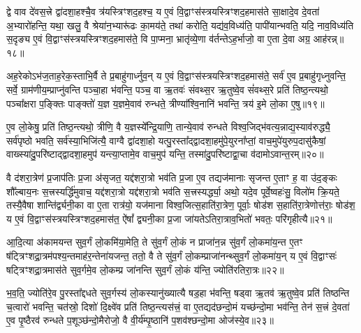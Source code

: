द्वे वाव दे॑वस॒त्त्रे द्वा॑दशा॒हश्चै॒व त्र॑यस्त्रिꣳशद॒हश्च॒ य ए॒वं वि॒द्वाꣳस॑स्त्रयस्त्रिꣳशद॒हमास॑ते सा॒क्षादे॒व दे॒वता॑ अ॒भ्यारो॑हन्ति॒ यथा॒ खलु॒ वै श्रेया॑न॒भ्यारू॑ढः का॒मय॑ते॒ तथा॑ करोति॒ यद्य॑व॒विध्य॑ति॒ पापी॑यान्भवति॒ यदि॒ नाव॒विध्य॑ति स॒दृङ्य ए॒वं वि॒द्वाꣳस॑स्त्रयस्त्रिꣳशद॒हमास॑ते॒ वि पा॒प्मना॒ भ्रातृ॑व्ये॒णा व॑र्तन्ते\-ऽह॒र्भाजो॒ वा ए॒ता दे॒वा अग्र॒ आह॑रन्न्॥१८॥

अह॒रेको\-ऽभ॑ज॒ताह॒रेक॒स्ताभि॒र्वै ते प्र॒बाहु॑गार्ध्नुव॒न् य ए॒वं वि॒द्वाꣳस॑स्त्रयस्त्रिꣳशद॒हमास॑ते॒ सर्व॑ ए॒व प्र॒बाहु॑गृध्नुवन्ति॒ सर्वे॒ ग्राम॑णीय॒म्प्राप्नु॑वन्ति पञ्चा॒हा भ॑वन्ति॒ पञ्च॒ वा ऋ॒तवः॑ संवथ्स॒र ऋ॒तुष्वे॒व सं॑वथ्स॒रे प्रति॑ तिष्ठ॒न्त्यथो॒ पञ्चा᳚क्षरा प॒ङ्क्तिः पाङ्क्तो॑ य॒ज्ञ य॒ज्ञमे॒वाव॑ रुन्धते॒ त्रीण्या᳚श्वि॒नानि॑ भवन्ति॒ त्रय॑ इ॒मे लो॒का ए॒षु॥१९॥

ए॒व लो॒केषु॒ प्रति॑ तिष्ठ॒न्त्यथो॒ त्रीणि॒ वै य॒ज्ञस्ये᳚न्द्रि॒याणि॒ तान्ये॒वाव॑ रुन्धते विश्व॒जिद्भ॑वत्य॒न्नाद्य॒स्याव॑रुद्ध्यै॒ सर्व॑पृष्ठो भवति॒ सर्व॑स्या॒भिजि॑त्यै॒ वाग्वै द्वा॑दशा॒हो यत्पु॒रस्ता᳚द्द्वादशा॒हमु॑पे॒युरना᳚प्तां॒ वाच॒मुपे॑युरुप॒दासु॑कैषां॒ वाख्स्या॑दु॒परि॑ष्टाद्द्वादशा॒हमुप॑ यन्त्या॒प्तामे॒व वाच॒मुप॑ यन्ति॒ तस्मा॑दु॒परि॑ष्टाद्वा॒चा व॑दामो\-ऽवान्त॒रम्॥२०॥

वै द॑शरा॒त्रेण॑ प्र॒जाप॑तिः प्र॒जा अ॑सृजत॒ यद्द॑शरा॒त्रो भव॑ति प्र॒जा ए॒व तद्यज॑मानाः सृजन्त ए॒ताꣳ ह॒ वा उ॑द॒ङ्कः शौ᳚ल्बाय॒नः स॒त्त्रस्यर्द्धि॑मुवाच॒ यद्द॑शरा॒त्रो यद्द॑शरा॒त्रो भव॑ति स॒त्त्रस्यर्द्ध्या॒ अथो॒ यदे॒व पूर्वे॒ष्वहः॑सु॒ विलो॑म क्रि॒यते॒ तस्यै॒वैषा शान्ति॑र्द्व्यनी॒का वा ए॒ता रात्र॑यो॒ यज॑माना विश्व॒जित्स॒हाति॑रा॒त्रेण॒ पूर्वाः॒ षोड॑श स॒हाति॑रा॒त्रेणोत्त॑राः॒ षोड॑श॒ य ए॒वं वि॒द्वाꣳस॑स्त्रयस्त्रिꣳशद॒हमास॑त॒ ऐ॑षां᳚ द्व्यनी॒का प्र॒जा जा॑यते\-ऽतिरा॒त्राव॒भितो॑ भवतः॒ परि॑गृहीत्यै॥२१॥

{\anuvakamend[{अ॒ह॒र॒न्ने॒ष्व॑वान्त॒रꣳ षोड॑श स॒ह स॒प्तद॑श च॥५॥}]}

आ॒दि॒त्या अ॑कामयन्त सुव॒र्गं लो॒कमि॑या॒मेति॒ ते सु॑व॒र्गं लो॒कं न प्राजा॑न॒न्न सु॑व॒र्गं लो॒कमा॑य॒न्त ए॒तꣳ ष॑ट्त्रिꣳशद्रा॒त्रम॑पश्य॒न्तमाह॑र॒न्तेना॑यजन्त॒ ततो॒ वै ते सु॑व॒र्गं लो॒कम्प्राजा॑नन्थ्सुव॒र्गं लो॒कमा॑य॒न् य ए॒वं वि॒द्वाꣳसः॑ षट्त्रिꣳशद्रा॒त्रमास॑ते सुव॒र्गमे॒व लो॒कम्प्र जा॑नन्ति सुव॒र्गं लो॒कं य॑न्ति॒ ज्योति॑रतिरा॒त्रः॥२२॥

भ॒व॒ति॒ ज्योति॑रे॒व पु॒रस्ता᳚द्दधते सुव॒र्गस्य॑ लो॒कस्यानु॑ख्यात्यै षड॒हा भ॑वन्ति॒ षड्वा ऋ॒तव॑ ऋ॒तुष्वे॒व प्रति॑ तिष्ठन्ति च॒त्वारो॑ भवन्ति॒ चत॑स्रो॒ दिशो॑ दि॒क्ष्वे॑व प्रति॑ तिष्ठ॒न्त्यस॑त्त्रं॒ वा ए॒तद्यद॑छन्दो॒मं यच्छ॑न्दो॒मा भव॑न्ति॒ तेन॑ स॒त्त्रं दे॒वता॑ ए॒व पृ॒ष्ठैरव॑ रुन्धते प॒शूञ्छ॑न्दो॒मैरोजो॒ वै वी॒र्य॑म्पृ॒ष्ठानि॑ प॒शव॑श्छन्दो॒मा ओज॑स्ये॒व॥२३॥

